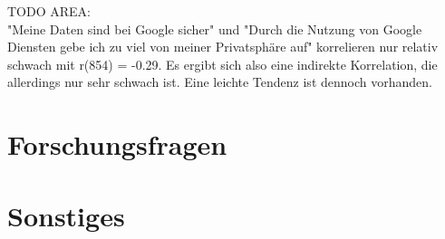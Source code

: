TODO AREA:\\
"Meine Daten sind bei Google sicher" und "Durch die Nutzung von Google Diensten gebe ich zu viel von meiner Privatsphäre auf" korrelieren nur relativ schwach mit r(854) = -0.29. Es ergibt sich also eine indirekte Korrelation, die allerdings nur sehr schwach ist. Eine leichte Tendenz ist dennoch vorhanden.

\section{Forschungsfragen}

\section{Sonstiges}
